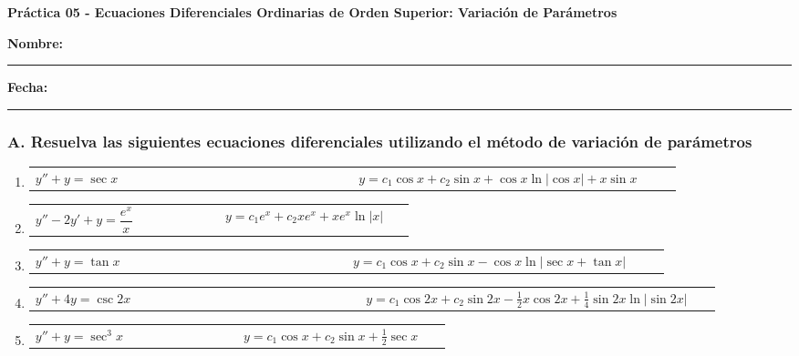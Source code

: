 \documentclass[a4paper,12pt]{article}
\begin{document}
\begin{center}
    \Large\textbf{Práctica 05 - Ecuaciones Diferenciales Ordinarias de Orden Superior: Variación de Parámetros}\\[1cm]  
\end{center}
  \textbf{Nombre:} \rule{9cm}{0.4pt}  \textbf{Fecha:} \rule{4.5cm}{0.4pt}

\vspace{0.5cm}

\subsubsection*{A. Resuelva las siguientes ecuaciones diferenciales utilizando el método de variación de parámetros}

\begin{enumerate}
    \item
    \begin{tabularx}{\linewidth}{L{0.45\linewidth} R{0.45\linewidth}}
    \( y'' + y = \sec x \) & \(\displaystyle y = c_1 \cos x + c_2 \sin x + \cos x \ln|\cos x| + x \sin x \)
    \end{tabularx}
    
    \item
    \begin{tabularx}{\linewidth}{L{0.45\linewidth} R{0.45\linewidth}}
    \( y'' - 2y' + y = \dfrac{e^x}{x} \) & \(\displaystyle y = c_1 e^x + c_2 x e^x + x e^x \ln|x| \)
    \end{tabularx}
    
    \item
    \begin{tabularx}{\linewidth}{L{0.45\linewidth} R{0.45\linewidth}}
    \( y'' + y = \tan x \) & \(\displaystyle y = c_1 \cos x + c_2 \sin x - \cos x \ln|\sec x + \tan x| \)
    \end{tabularx}
    
    \item
    \begin{tabularx}{\linewidth}{L{0.45\linewidth} R{0.45\linewidth}}
    \( y'' + 4y = \csc 2x \) & \(\displaystyle y = c_1 \cos 2x + c_2 \sin 2x - \frac{1}{2} x \cos 2x + \frac{1}{4} \sin 2x \ln|\sin 2x| \)
    \end{tabularx}
    
    \item
    \begin{tabularx}{\linewidth}{L{0.45\linewidth} R{0.45\linewidth}}
    \( y'' + y = \sec^3 x \) & \(\displaystyle y = c_1 \cos x + c_2 \sin x + \frac{1}{2} \sec x \)
    \end{tabularx}
    

\end{enumerate}
\end{document}
